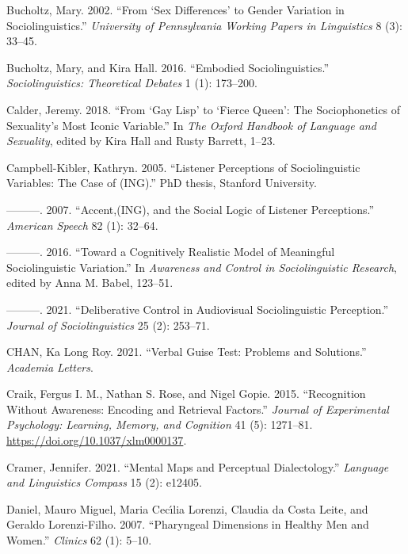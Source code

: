 \documentclass[
  letterpaper,
  DIV=11,
  numbers=noendperiod]{scrartcl}
\newlength{\cslhangindent}
\newenvironment{CSLReferences}[2] %
 {\begin{list}{}{%
  \setlength{\itemindent}{0pt}
  \setlength{\leftmargin}{0pt}
  \setlength{\parsep}{0pt}
  \ifodd #1
   \setlength{\leftmargin}{\cslhangindent}
   \setlength{\itemindent}{-1\cslhangindent}
  \fi
  \setlength{\itemsep}{#2\baselineskip}}}
 {\end{list}}
\begin{document}
\begin{CSLReferences}{1}{0}
Bucholtz, Mary. 2002. {``From {`Sex Differences'} to Gender Variation in
Sociolinguistics.''} \emph{University of Pennsylvania Working Papers in
Linguistics} 8 (3): 33--45.

Bucholtz, Mary, and Kira Hall. 2016. {``Embodied Sociolinguistics.''}
\emph{Sociolinguistics: Theoretical Debates} 1 (1): 173--200.

Calder, Jeremy. 2018. {``From {`Gay Lisp'} to {`Fierce Queen'}: The
Sociophonetics of Sexuality's Most Iconic Variable.''} In \emph{The
Oxford Handbook of Language and Sexuality}, edited by Kira Hall and
Rusty Barrett, 1--23.

Campbell-Kibler, Kathryn. 2005. {``Listener Perceptions of
Sociolinguistic Variables: The Case of (ING).''} PhD thesis, Stanford
University.

---------. 2007. {``Accent,(ING), and the Social Logic of Listener
Perceptions.''} \emph{American Speech} 82 (1): 32--64.

---------. 2016. {``Toward a Cognitively Realistic Model of Meaningful
Sociolinguistic Variation.''} In \emph{Awareness and Control in
Sociolinguistic Research}, edited by Anna M. Babel, 123--51.

---------. 2021. {``Deliberative Control in Audiovisual Sociolinguistic
Perception.''} \emph{Journal of Sociolinguistics} 25 (2): 253--71.

CHAN, Ka Long Roy. 2021. {``Verbal Guise Test: Problems and
Solutions.''} \emph{Academia Letters}.

Craik, Fergus I. M., Nathan S. Rose, and Nigel Gopie. 2015.
{``Recognition Without Awareness: {Encoding} and Retrieval Factors.''}
\emph{Journal of Experimental Psychology: Learning, Memory, and
Cognition} 41 (5): 1271--81. \url{https://doi.org/10.1037/xlm0000137}.

Cramer, Jennifer. 2021. {``Mental Maps and Perceptual Dialectology.''}
\emph{Language and Linguistics Compass} 15 (2): e12405.

Daniel, Mauro Miguel, Maria Cecı́lia Lorenzi, Claudia da Costa Leite, and
Geraldo Lorenzi-Filho. 2007. {``Pharyngeal Dimensions in Healthy Men and
Women.''} \emph{Clinics} 62 (1): 5--10.


\end{CSLReferences}
\end{document}
